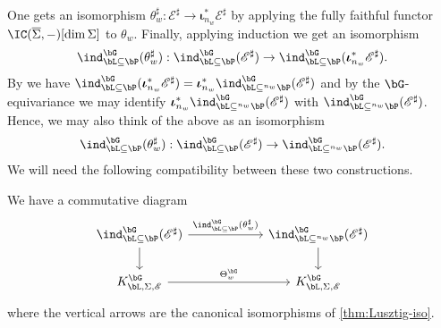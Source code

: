\documentclass[eqthmnum,nocolour,skinny]{jt-calcs}
\begin{document}
\begin{pa}
One gets an isomorphism $\theta_w^{\sharp} : \mathscr{E}^{\sharp} \to \boldsymbol{\iota}_{n_w}^*\mathscr{E}^{\sharp}$ by applying the fully faithful functor $\IC(\overline{\Sigma},-)[\dim\Sigma]$ to $\theta_w$. Finally, applying induction we get an isomorphism
\begin{equation*}
\ind_{\bL\subseteq\bP}^{\bG}(\theta_w^{\sharp}) : \ind_{\bL\subseteq\bP}^{\bG}(\mathscr{E}^{\sharp}) \to \ind_{\bL\subseteq\bP}^{\bG}(\boldsymbol{\iota}_{n_w}^*\mathscr{E}^{\sharp}).
\end{equation*}
By \cite[Lem.~3.9]{taylor:2014:evaluating-characteristic-functions} we have $\ind_{\bL\subseteq\bP}^{\bG}(\boldsymbol{\iota}_{n_w}^*\mathscr{E}^{\sharp}) = \boldsymbol{\iota}_{n_w}^*\ind_{\bL\subseteq{}^{n_w}\bP}^{\bG}(\mathscr{E}^{\sharp})$ and by the $\bG$-equivariance we may identify $\boldsymbol{\iota}_{n_w}^*\ind_{\bL\subseteq{}^{n_w}\bP}^{\bG}(\mathscr{E}^{\sharp})$ with $\ind_{\bL\subseteq{}^{n_w}\bP}^{\bG}(\mathscr{E}^{\sharp})$. Hence, we may also think of the above as an isomorphism
\begin{equation*}
\ind_{\bL\subseteq\bP}^{\bG}(\theta_w^{\sharp}) : \ind_{\bL\subseteq\bP}^{\bG}(\mathscr{E}^{\sharp}) \to \ind_{\bL\subseteq {}^{n_w}\bP}^{\bG}(\mathscr{E}^{\sharp}).
\end{equation*}
We will need the following compatibility between these two constructions.
\end{pa}

\begin{prop}\label{lem:compatible-endomorphisms}
We have a commutative diagram
\begin{equation*}
\begin{tikzcd}[column sep=6em]
\ind_{\bL\subseteq\bP}^{\bG}(\mathscr{E}^{\sharp}) \arrow[r,"\ind_{\bL\subseteq\bP}^{\bG}(\theta_w^{\sharp})"]\arrow[d] & \ind_{\bL\subseteq{}^{n_w}\bP}^{\bG}(\mathscr{E}^{\sharp}) \arrow[d]\\
K_{\bL,\Sigma,\mathscr{E}}^{\bG} \arrow[r,"\Theta_w^{\bG}"] & K_{\bL,\Sigma,\mathscr{E}}^{\bG}
\end{tikzcd}
\end{equation*}
where the vertical arrows are the canonical isomorphisms of \cref{thm:Lusztig-iso}.
\end{prop}
\end{document}

